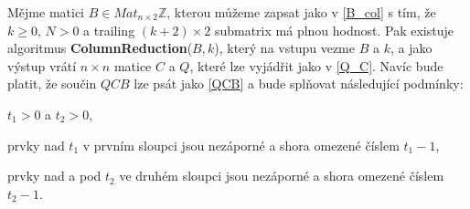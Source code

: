 \begin{vet} \label{col_red}
Mějme matici $ B \in Mat_{n \times 2}\mathbb{Z} $, kterou můžeme zapsat jako v
\ref{B_col} s tím, že $ k \geq 0$, $ N > 0 $ a trailing $ (k+2) \times 2 $
submatrix má plnou hodnost. Pak existuje algoritmus \textbf{ColumnReduction}($B, k$),
který na vstupu vezme $ B $ a $ k $, a jako výstup vrátí $ n \times n $
matice $ C $ a $ Q $, které lze vyjádřit jako v \ref{Q_C}. Navíc bude platit, že
součin $ QCB $ lze psát jako \ref{QCB} a bude splňovat následující podmínky:

\begin{Cond}
    \item $ t_1 > 0 $ a $ t_2 > 0 $,
    \item prvky nad $ t_1 $ v prvním sloupci jsou nezáporné a shora omezené číslem
    $ t_1 - 1 $,
    \item prvky nad a pod $ t_2 $ ve druhém sloupci jsou nezáporné a shora omezené
    číslem $ t_2 - 1 $.
\end{Cond}

\end{vet}
